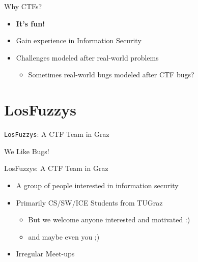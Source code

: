 \begin{frame}
  {Why CTFs?}

  \begin{itemize}
    \item \textbf{It's fun!}
    \item Gain experience in Information Security
    \item Challenges modeled after real-world problems
      \begin{itemize}
        \item Sometimes real-world bugs modeled after CTF bugs?
      \end{itemize}
  \end{itemize}
\end{frame}

\section{LosFuzzys}

{
\begin{frame}

  {\huge
    \texttt{LosFuzzys}: A CTF Team in Graz}

  \vspace{19em}

  {\Large
  We Like Bugs!}

\end{frame}
}

\begin{frame}
  {LosFuzzys: A CTF Team in Graz}

  \begin{itemize}
    \item A group of people interested in information security
    \item Primarily CS/SW/ICE Students from TUGraz
      \begin{itemize}
        \item But we welcome anyone interested and motivated :)
        \item and maybe even you ;)
      \end{itemize}
    \item Irregular Meet-ups
  \end{itemize}
\end{frame}

